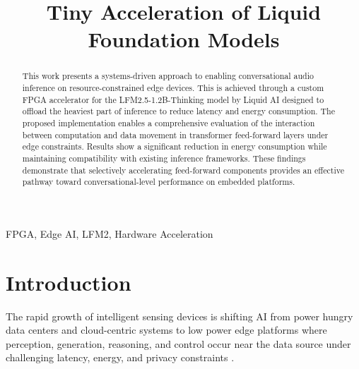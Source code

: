 \documentclass[conference]{IEEEtran}
\begin{document}
\title{Tiny Acceleration of Liquid Foundation Models}

\author{
\and
{}
\and
{}
}

\maketitle

\begin{abstract}
This work presents a systems-driven approach to enabling conversational audio inference on resource-constrained edge devices. This is achieved through a custom FPGA accelerator for the LFM2.5-1.2B-Thinking model by Liquid AI designed to offload the heaviest part of inference to reduce latency and energy consumption. The proposed implementation enables a comprehensive evaluation of the interaction between computation and data movement in transformer feed-forward layers under edge constraints. Results show a significant reduction in energy consumption while maintaining compatibility with existing inference frameworks. These findings demonstrate that selectively accelerating feed-forward components provides an effective pathway toward conversational-level performance on embedded platforms.
\end{abstract}

\begin{IEEEkeywords}
FPGA, Edge AI, LFM2, Hardware Acceleration
\end{IEEEkeywords}

\section{Introduction}\label{introd}
The rapid growth of intelligent sensing devices is shifting AI from power hungry data centers and cloud-centric systems to low power edge platforms where perception, generation, reasoning, and control occur near the data source under challenging latency, energy, and privacy constraints \cite{reddi2025generative}. 
\end{document}
